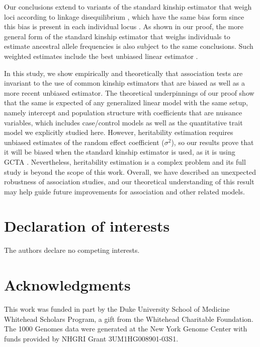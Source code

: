 \documentclass[11pt]{article}
\begin{document}
Our conclusions extend to variants of the standard kinship estimator that weigh loci according to linkage disequilibrium \citep{speed_reevaluation_2017, wang_efficient_2017}, which have the same bias form since this bias is present in each individual locus \citep{ochoa_estimating_2021}.
As shown in our proof, the more general form of the standard kinship estimator that weighs individuals to estimate ancestral allele frequencies \pith is also subject to the same conclusions.
Such weighted \pith estimates include the best unbiased linear estimator \citep{astle_population_2009, thornton_roadtrips:_2010}.

In this study, we show empirically and theoretically that association tests are invariant to the use of common kinship estimators that are biased as well as a more recent unbiased estimator.
The theoretical underpinnings of our proof show that the same is expected of any generalized linear model with the same setup, namely intercept and population structure with coefficients that are nuisance variables, which includes case/control models as well as the quantitative trait model we explicitly studied here.
However, heritability estimation requires unbiased estimates of the random effect coefficient ($\sigma^2$), so our results prove that it will be biased when the standard kinship estimator is used, as it is using GCTA \citep{yang_gcta:_2011, yang_advantages_2014}.
Nevertheless, heritability estimation is a complex problem and its full study is beyond the scope of this work.
Overall, we have described an unexpected robustness of association studies, and our theoretical understanding of this result may help guide future improvements for association and other related models.



\section*{Declaration of interests}
The authors declare no competing interests.

\section*{Acknowledgments}
This work was funded in part by the Duke University School of Medicine Whitehead Scholars Program, a gift from the Whitehead Charitable Foundation.
The 1000 Genomes data were generated at the New York Genome Center with funds provided by NHGRI Grant 3UM1HG008901-03S1.
\end{document}

